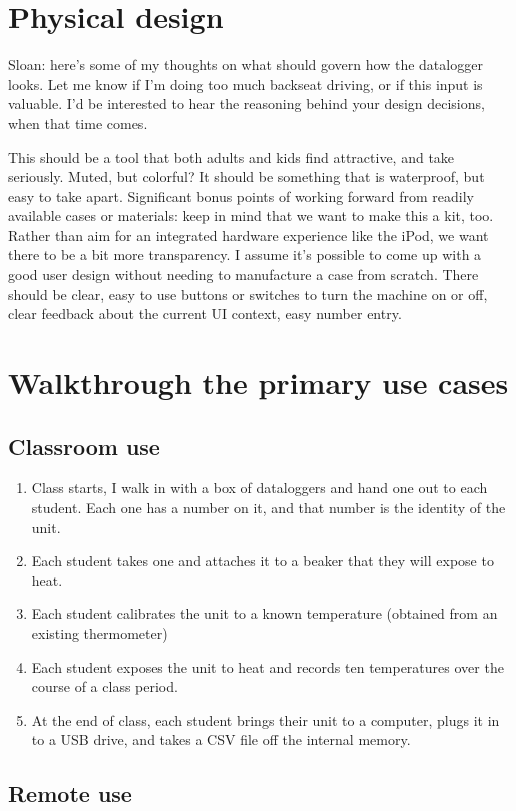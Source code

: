 \documentclass[11pt]{article}
\begin{document}
\section{Physical design}
Sloan: here's some of my thoughts on what should govern how the datalogger looks.  Let me know if I'm doing too much backseat driving, or if this input is valuable.  I'd be interested to hear the reasoning behind your design decisions, when that time comes.

This should be a tool that both adults and kids find attractive, and take seriously.  Muted, but colorful?  It should be something that is waterproof, but easy to take apart.  Significant bonus points of working forward from readily available cases or materials: keep in mind that we want to make this a kit, too.  Rather than aim for an integrated hardware experience like the iPod, we want there to be a bit more transparency.  I assume it's possible to come up with a good user design without needing to manufacture a case from scratch.  There should be clear, easy to use buttons or switches to turn the machine on or off, clear feedback about the current UI context, easy number entry.

\section{Walkthrough the primary use cases}
\subsection{Classroom use}
\begin{enumerate}
\item Class starts, I walk in with a box of dataloggers and hand one out to each student.  Each one has a number on it, and that number is the identity of the unit.
\item Each student takes one and attaches it to a beaker that they will expose to heat.
\item Each student calibrates the unit to a known temperature (obtained from an existing thermometer)
\item Each student exposes the unit to heat and records ten temperatures over the course of a class period.
\item At the end of class, each student brings their unit to a computer, plugs it in to a USB drive, and takes a CSV file off the internal memory.
\end{enumerate}
\subsection{Remote use}
\end{document}
